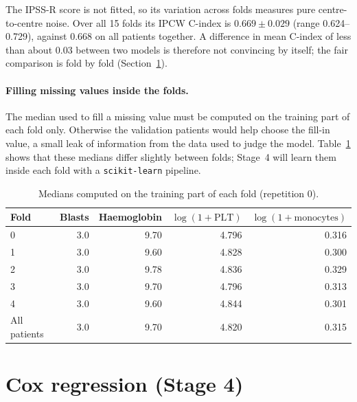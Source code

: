 \documentclass[11pt,a4paper]{article}
\begin{document}
The IPSS-R score is not fitted, so its variation across folds measures pure
centre-to-centre noise. Over all 15 folds its IPCW C-index is
$0.669 \pm 0.029$ (range 0.624--0.729), against 0.668 on all patients together. A
difference in mean C-index of less than about 0.03 between two models is therefore not
convincing by itself; the fair comparison is fold by fold (Section~\ref{sec:cox}).

\paragraph{Filling missing values inside the folds.} The median used to fill a missing
value must be computed on the training part of each fold only. Otherwise the validation
patients would help choose the fill-in value, a small leak of information from the data
used to judge the model. Table~\ref{tab:foldmed} shows that these medians differ slightly
between folds; Stage~4 will learn them inside each fold with a
\texttt{scikit-learn} pipeline.

\begin{table}[H]
\centering
\caption{Medians computed on the training part of each fold (repetition 0).}
\label{tab:foldmed}
\begin{tabular}{lrrrr}
\toprule
Fold & Blasts & Haemoglobin & $\log(1+\text{PLT})$ & $\log(1+\text{monocytes})$ \\
\midrule
0 & 3.0 & 9.70 & 4.796 & 0.316 \\
1 & 3.0 & 9.60 & 4.828 & 0.300 \\
2 & 3.0 & 9.78 & 4.836 & 0.329 \\
3 & 3.0 & 9.70 & 4.796 & 0.313 \\
4 & 3.0 & 9.60 & 4.844 & 0.301 \\
All patients & 3.0 & 9.70 & 4.820 & 0.315 \\
\bottomrule
\end{tabular}
\end{table}

\section{Cox regression (Stage 4)}
\label{sec:cox}
\end{document}
